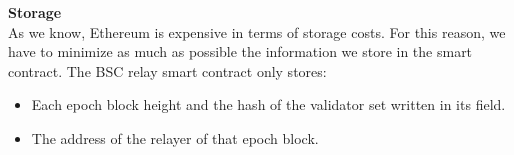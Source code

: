 

\noindent
\textbf{Storage}\\
As we know, Ethereum is expensive in terms of storage costs. For this reason, we have to minimize as much as possible the information we store in the smart contract. The BSC relay smart contract only stores: 
\begin{itemize}
    \item Each epoch block height and the hash of the validator set written in its \extradata field.
    \item The address of the relayer of that epoch block. 
\end{itemize}

